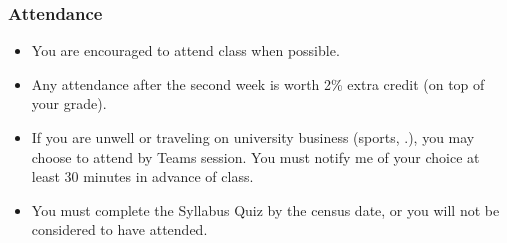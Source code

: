 \begin{frame}
  \frametitle{Attendance}

  \begin{itemize}
  \item You are encouraged to attend class when possible.
  \item Any attendance after the second week is worth 2\% extra credit (on top of your grade).
  \item If you are unwell or traveling on university business (sports, \etc.), you may choose to attend by Teams session.
    You must notify me of your choice at least 30 minutes in advance of class.
  \item[\(\Rightarrow\)] You must complete the Syllabus Quiz by the census date, or you will not be considered to have attended.
  \end{itemize}
  
\end{frame}
